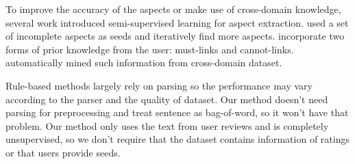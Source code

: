 To improve the accuracy of the aspects or make use of cross-domain knowledge, several work introduced semi-supervised learning for aspect extraction. 
\cite{mukherjee2012aspect} used a set of incomplete aspects as seeds and iteratively find more aspects. 
\cite{andrzejewski2009incorporating} incorporate two forms of prior knowledge from the user: must-links and cannot-links. 
\cite{chen2014aspect} automatically mined such information from cross-domain dataset.

Rule-based methods largely rely on parsing so the performance may vary according to the parser and the quality of dataset. Our method doesn’t need parsing for preprocessing and treat sentence as bag-of-word, so it won’t have that problem. Our method only uses the text from user reviews and is completely unsupervised, so we don’t require that the dataset contains information of ratings or that users provide seeds. 
